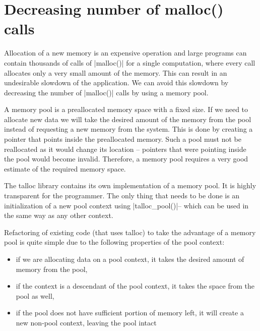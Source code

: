 \section{Decreasing number of malloc() calls}
\label{talloc:pool}

Allocation of a new memory is an expensive operation and large programs can
contain thousands of calls of |malloc()| for a single computation, where every
call allocates only a very small amount of the memory. This can result in an
undesirable slowdown of the application. We can avoid this slowdown by
decreasing the number of |malloc()| calls by using a memory pool.

A memory pool is a preallocated memory space with a fixed size. If we need to
allocate new data we will take the desired amount of the memory from the pool
instead of requesting a new memory from the system. This is done by creating a
pointer that points inside the preallocated memory. Such a pool must not be
reallocated as it would change its location -- pointers that were pointing
inside the pool would become invalid. Therefore, a memory pool requires a very
good estimate of the required memory space.

The talloc library contains its own implementation of a memory pool. It is
highly transparent for the programmer. The only thing that needs to be done is
an initialization of a new pool context using |talloc_pool()|\footnotemark --
which can be used in the same way as any other context.

\noindent
Refactoring of existing code (that uses talloc) to take the advantage of a
memory pool is quite simple due to the following properties of the pool context:

\begin{itemize}
  \item if we are allocating data on a pool context, it takes the desired
  amount of memory from the pool,
  \item if the context is a descendant of the pool context, it takes the space
  from the pool as well,
  \item if the pool does not have sufficient portion of memory left, it will
  create a new non-pool context, leaving the pool intact
\end{itemize}

